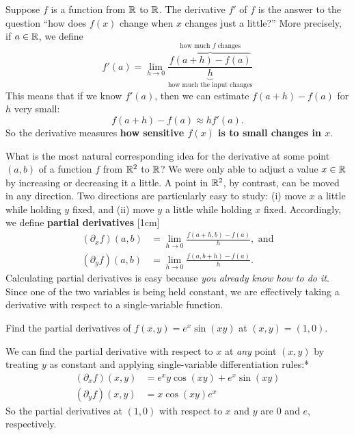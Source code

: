 \documentclass[svgnames]{watsonbook}
\begin{document}


  Suppose $f$ is a function from $\mathbb{R}$ to $\mathbb{R}$. The derivative $f'$ of
  $f$ is the answer to the question ``how does $f(x)$ change when $x$
  changes just a little?'' More precisely, if $a\in \mathbb{R}$, we define
  \[
    f'(a) = \lim_{h \to 0} \frac{\overbrace{f(a+h)-f(a)}^{\text{how
          much $f$ changes}}}{\underbrace{h}_{\text{how much the input
          changes}}}
  \]
  This means that if we know $f'(a)$, then we can estimate
  $f(a+h) - f(a)$ for $h$ very small:
  \[
    f(a+h) - f(a) \approx h
    f'(a). 
  \]
  So the derivative measures \textbf{how sensitive $f(x)$ is to small
    changes in $x$}.
  
  What is the most natural corresponding idea for the derivative at
  some point $(a,b)$ of a function $f$ from $\mathbb{R}^2$ to $\mathbb{R}$? We were
  only able to adjust a value $x\in \mathbb{R}$ by increasing or decreasing it
  a little. A point in $\mathbb{R}^2$, by contrast, can be moved in any
  direction. Two directions are particularly easy to study: (i) move
  $x$ a little while holding $y$ fixed, and (ii) move $y$ a little
  while holding $x$ fixed. Accordingly, we define \textbf{partial
    derivatives} [1cm]
  \begin{align*}
    (\partial_x f)(a,b) &= \lim_{h \to 0}\frac{f(a+h,b) - f(a)}{h},
                          \text{ and} \\
    (\partial_y f)(a,b) &= \lim_{h \to 0}\frac{f(a,b+h) - f(a)}{h}. 
  \end{align*}
  Calculating partial derivatives is easy because \textit{you already
    know how to do it}. Since one of the two variables is being held
  constant, we are effectively taking a derivative with respect to a
  single-variable function.

  \begin{example}{}{}
    Find the partial derivatives of $f(x,y) = e^x \sin (xy)$ at $(x,y)
    = (1,0)$. 
  \end{example}

  \begin{solution}
    We can find the partial derivative with respect to $x$ at
    \textit{any} point $(x,y)$ by treating $y$ as constant and
    applying single-variable differentiation rules:* 
    \begin{align*}
      (\partial_xf)(x,y) &= e^{x} y \cos\left(x y\right) + e^{x}
                           \sin\left(x y\right) \\  
      (\partial_yf)(x,y)  &= x \cos\left(x y\right) e^{x}
    \end{align*}
    So the partial derivatives at $(1,0)$ with respect to $x$ and $y$
    are 0 and $e$, respectively.
  \end{solution}
\end{document}
